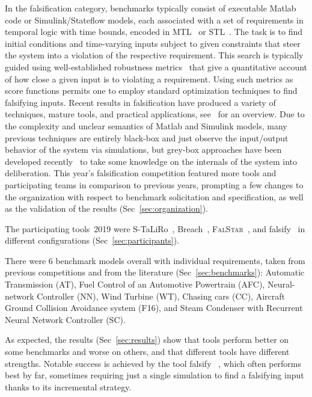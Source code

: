 \documentclass[a4paper]{easychair}
\newcommand{\STaLiRo}{S-TaLiRo\xspace}
\newcommand{\Breach}{Breach\xspace}
\newcommand{\FalStar}{\textsc{FalStar}\xspace}
\newcommand{\falsify}{falsify\xspace}
\begin{document}
	In the falsification category, benchmarks typically consist of
    executable Matlab code or Simulink/Stateflow models, each
    associated with a set of requirements in temporal logic with time
    bounds, encoded in MTL~\cite{Koymans1990} or STL~\cite{MalerN04}.
    The task is to find initial conditions and time-varying inputs
    subject to given constraints that steer the system into a
    violation of the respective requirement.  This search is typically
    guided using well-established robustness
    metrics~\cite{FainekosPappas2009} that give a quantitative account
    of how close a given input is to violating a requirement.  Using such
    metrics as score functions permits one to employ standard
    optimization techniques to find falsifying inputs.  Recent results
    in falsification have produced a variety of techniques, mature
    tools, and practical applications, see~\cite{BDDFMNS2018} for an
    overview.  Due to the complexity and unclear semantics of Matlab
    and Simulink models, many previous techniques are entirely
    black-box and just observe the input/output behavior of the system
    via simulations, but grey-box approaches have been developed
    recently~\cite{YaghoubiHSCC,DBLP:conf/fm/AkazakiLYDH18} to take
    some knowledge on the internals of the system into deliberation.
    This year's falsification competition featured more tools and
    participating teams in comparison to previous years, prompting a
    few changes to the organization with respect to benchmark
    solicitation and specification, as well as the validation of the
    results (Sec~\ref{sec:organization}).

    The participating tools~2019 were \STaLiRo~\cite{annpureddy2011s},
    \Breach~\cite{Donze2010},
    \FalStar~\cite{ZhangESAH2018-MCTS,ErnstSZH2018-FalStar}, and
    \falsify~\cite{DBLP:conf/fm/AkazakiLYDH18} in different
    configurations (Sec~\ref{sec:participants}).

	There were 6 benchmark models overall with individual requirements,
    taken from previous competitions and from the literature (Sec~\ref{sec:benchmarks}):
	Automatic Transmission (AT),
	Fuel Control of an Automotive Powertrain (AFC),
	Neural-network Controller (NN),
	Wind Turbine (WT),
	Chasing cars (CC),
	Aircraft Ground Collision Avoidance system (F16),
	and Steam Condenser with Recurrent Neural Network Controller (SC).

    As expected, the results (Sec~\ref{sec:results}) show that tools
    perform better on some benchmarks and worse on others, and that
    different tools have different strengths.  Notable success is
    achieved by the tool \falsify~\cite{DBLP:conf/fm/AkazakiLYDH18} ,
    which often performs best by far, sometimes requiring just a
    single simulation to find a falsifying input thanks to its
    incremental strategy.
\end{document}
